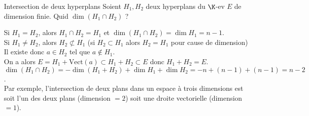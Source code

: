 \documentclass[12pt, a4paper]{report}
\begin{document}
\begin{exemple}[Exercice]{Intersection de deux hyperplans}
Soient $H_1,H_2$ deux hyperplans du $\K$-ev $E$ de dimension finie. Quid $\dim (H_1 \cap H_2)$ ?

Si $H_1 = H_2$, alors $H_1 \cap H_2 = H_1$ et $\dim (H_1\cap H_2) = \dim H_1 = n-1$. \\
Si $H_1 \ne H_2$, alors $H_2 \not \subset H_1$ (si $H_2 \subset H_1$ alors $H_2 = H_1$ pour cause de dimension) \\
Il existe donc $a \in H_2$ tel que $a \not \in H_1$. \\
On a alors $E = H_1+\text{Vect}(a) \subset H_1+H_2 \subset E$ donc $H_1+H_2 = E$. \\
$\dim (H_1 \cap H_2) = -\dim(H_1+H_2) + \dim H_1 + \dim H_2 = -n + (n-1)+(n-1) = n-2$. \\

Par exemple, l'intersection de deux plans dans un espace à trois dimensions est soit l'un des deux plans (dimension $= 2$) soit une droite vectorielle (dimension $=1$).
\end{exemple}
\end{document}
